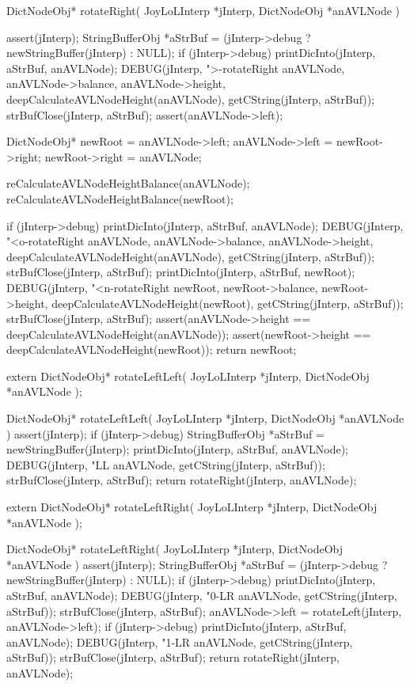 \startCCode
DictNodeObj* rotateRight(
  JoyLoLInterp *jInterp,
  DictNodeObj      *anAVLNode
) {
  assert(jInterp);
  StringBufferObj *aStrBuf =
    (jInterp->debug ? newStringBuffer(jInterp) : NULL);
  if (jInterp->debug) {
    printDicInto(jInterp, aStrBuf, anAVLNode);
    DEBUG(jInterp, ">-rotateRight %
          anAVLNode, anAVLNode->balance, anAVLNode->height,
          deepCalculateAVLNodeHeight(anAVLNode),
          getCString(jInterp, aStrBuf));
    strBufClose(jInterp, aStrBuf);
  }
  assert(anAVLNode->left);

  DictNodeObj* newRoot = anAVLNode->left;
  anAVLNode->left = newRoot->right;
  newRoot->right  = anAVLNode;

  reCalculateAVLNodeHeightBalance(anAVLNode);
  reCalculateAVLNodeHeightBalance(newRoot);

  if (jInterp->debug) {
    printDicInto(jInterp, aStrBuf, anAVLNode);
    DEBUG(jInterp, "<o-rotateRight %
          anAVLNode, anAVLNode->balance, anAVLNode->height,
          deepCalculateAVLNodeHeight(anAVLNode),
          getCString(jInterp, aStrBuf));
    strBufClose(jInterp, aStrBuf);
    printDicInto(jInterp, aStrBuf, newRoot);
    DEBUG(jInterp, "<n-rotateRight %
          newRoot, newRoot->balance, newRoot->height,
          deepCalculateAVLNodeHeight(newRoot),
          getCString(jInterp, aStrBuf));
    strBufClose(jInterp, aStrBuf);
  }
  assert(anAVLNode->height == deepCalculateAVLNodeHeight(anAVLNode));
  assert(newRoot->height == deepCalculateAVLNodeHeight(newRoot));
  return newRoot;
}
\stopCCode

\startCHeader
extern DictNodeObj* rotateLeftLeft(
  JoyLoLInterp *jInterp,
  DictNodeObj      *anAVLNode
);
\stopCHeader

\startCCode
DictNodeObj* rotateLeftLeft(
  JoyLoLInterp *jInterp,
  DictNodeObj      *anAVLNode
) {
  assert(jInterp);
  if (jInterp->debug) {
    StringBufferObj *aStrBuf = newStringBuffer(jInterp);
    printDicInto(jInterp, aStrBuf, anAVLNode);
    DEBUG(jInterp, "LL %
      anAVLNode, getCString(jInterp, aStrBuf));
    strBufClose(jInterp, aStrBuf);
  }
  return rotateRight(jInterp, anAVLNode);
}
\stopCCode

\startCHeader
extern DictNodeObj* rotateLeftRight(
  JoyLoLInterp *jInterp,
  DictNodeObj      *anAVLNode
);
\stopCHeader

\startCCode
DictNodeObj* rotateLeftRight(
  JoyLoLInterp *jInterp,
  DictNodeObj      *anAVLNode
) {
  assert(jInterp);
  StringBufferObj *aStrBuf =
    (jInterp->debug ? newStringBuffer(jInterp) : NULL);
  if (jInterp->debug) {
    printDicInto(jInterp, aStrBuf, anAVLNode);
    DEBUG(jInterp, "0-LR %
      anAVLNode, getCString(jInterp, aStrBuf));
    strBufClose(jInterp, aStrBuf);
  }
  anAVLNode->left = rotateLeft(jInterp, anAVLNode->left);
  if (jInterp->debug) {
    printDicInto(jInterp, aStrBuf, anAVLNode);
    DEBUG(jInterp, "1-LR %
      anAVLNode, getCString(jInterp, aStrBuf));
    strBufClose(jInterp, aStrBuf);
  }
  return rotateRight(jInterp, anAVLNode);
}
\stopCCode

